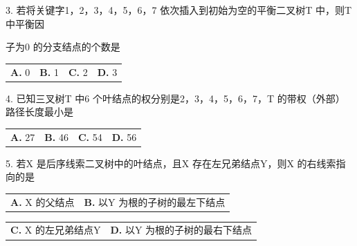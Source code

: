 \documentclass[UTF8,11pt]{ctexart}
\begin{document}
3. 若将关键字1，2，3，4，5，6，7 依次插入到初始为空的平衡二叉树T 中，则T 中平衡因


子为0 的分支结点的个数是


\begin{center}\begin{tabular}{>{\raggedright\arraybackslash}p{\dimexpr(\linewidth-8\tabcolsep)/4\relax}>{\raggedright\arraybackslash}p{\dimexpr(\linewidth-8\tabcolsep)/4\relax}>{\raggedright\arraybackslash}p{\dimexpr(\linewidth-8\tabcolsep)/4\relax}>{\raggedright\arraybackslash}p{\dimexpr(\linewidth-8\tabcolsep)/4\relax}}
\textbf{A.} 0 & \textbf{B.} 1 & \textbf{C.} 2 & \textbf{D.} 3\\[.35em]\end{tabular}\end{center}

4. 已知三叉树T 中6 个叶结点的权分别是2，3，4，5，6，7，T 的带权（外部）路径长度最小是


\begin{center}\begin{tabular}{>{\raggedright\arraybackslash}p{\dimexpr(\linewidth-8\tabcolsep)/4\relax}>{\raggedright\arraybackslash}p{\dimexpr(\linewidth-8\tabcolsep)/4\relax}>{\raggedright\arraybackslash}p{\dimexpr(\linewidth-8\tabcolsep)/4\relax}>{\raggedright\arraybackslash}p{\dimexpr(\linewidth-8\tabcolsep)/4\relax}}
\textbf{A.} 27 & \textbf{B.} 46 & \textbf{C.} 54 & \textbf{D.} 56\\[.35em]\end{tabular}\end{center}

5. 若X 是后序线索二叉树中的叶结点，且X 存在左兄弟结点Y，则X 的右线索指向的是


\begin{center}\begin{tabular}{>{\raggedright\arraybackslash}p{\dimexpr(\linewidth-4\tabcolsep)/2\relax}>{\raggedright\arraybackslash}p{\dimexpr(\linewidth-4\tabcolsep)/2\relax}}
\textbf{A.} X 的父结点 & \textbf{B.} 以Y 为根的子树的最左下结点\\[.35em]\end{tabular}\end{center}

\begin{center}\begin{tabular}{>{\raggedright\arraybackslash}p{\dimexpr(\linewidth-4\tabcolsep)/2\relax}>{\raggedright\arraybackslash}p{\dimexpr(\linewidth-4\tabcolsep)/2\relax}}
\textbf{C.} X 的左兄弟结点Y & \textbf{D.} 以Y 为根的子树的最右下结点\\[.35em]\end{tabular}\end{center}
\end{document}
